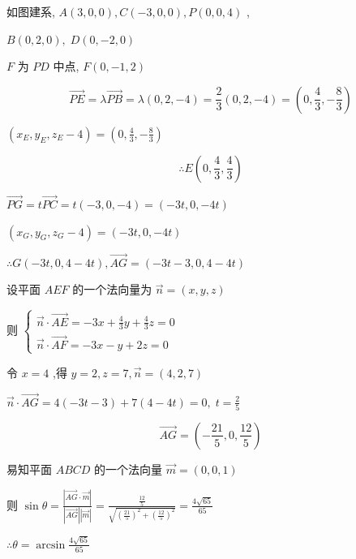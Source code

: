 \documentclass[10pt]{article}
\begin{document}
如图建系, \(A\left( {3,0,0}\right) ,C\left( {-3,0,0}\right) ,P\left( {0,0,4}\right)\) ,

\(B\left( {0,2,0}\right) ,\;D\left( {0, - 2,0}\right)\)

\(F\) 为 \({PD}\) 中点, \(F\left( {0, - 1,2}\right)\)

\[
\overrightarrow{PE} = \lambda \overrightarrow{PB} = \lambda \left( {0,2, - 4}\right)  = \frac{2}{3}\left( {0,2, - 4}\right)  = \left( {0,\frac{4}{3}, - \frac{8}{3}}\right)
\]

\(\left( {{x}_{E},{y}_{E},{z}_{E} - 4}\right)  = \left( {0,\frac{4}{3}, - \frac{8}{3}}\right)\)

\[
\therefore E\left( {0,\frac{4}{3},\frac{4}{3}}\right)
\]

\(\overrightarrow{PG} = t\overrightarrow{PC} = t\left( {-3,0, - 4}\right)  = \left( {-{3t},0, - {4t}}\right)\)

\(\left( {{x}_{G},{y}_{G},{z}_{G} - 4}\right)  = \left( {-{3t},0, - {4t}}\right)\)

\(\therefore G\left( {-{3t},0,4 - {4t}}\right) ,\overrightarrow{AG} = \left( {-{3t} - 3,0,4 - {4t}}\right)\)

设平面 \({AEF}\) 的一个法向量为 \(\overrightarrow{n} = \left( {x,y,z}\right)\)

则 \(\left\{  \begin{array}{l} \overrightarrow{n} \cdot  \overrightarrow{AE} =  - {3x} + \frac{4}{3}y + \frac{4}{3}z = 0 \\  \overrightarrow{n} \cdot  \overrightarrow{AF} =  - {3x} - y + {2z} = 0 \end{array}\right.\)

令 \(x = 4\) ,得 \(y = 2,z = 7,\overrightarrow{n} = \left( {4,2,7}\right)\)

\(\overrightarrow{n} \cdot  \overrightarrow{AG} = 4\left( {-{3t} - 3}\right)  + 7\left( {4 - {4t}}\right)  = 0,\;t = \frac{2}{5}\)

\[
\overrightarrow{AG} = \left( {-\frac{21}{5},0,\frac{12}{5}}\right)
\]

易知平面 \({ABCD}\) 的一个法向量 \(\overrightarrow{m} = \left( {0,0,1}\right)\)

则 \(\sin \theta  = \frac{\left| \overrightarrow{AG} \cdot  \overrightarrow{m}\right| }{\left| \overrightarrow{AG}\right| \left| \overrightarrow{m}\right| } = \frac{\frac{12}{5}}{\sqrt{{\left( \frac{21}{5}\right) }^{2} + {\left( \frac{12}{5}\right) }^{2}}} = \frac{4\sqrt{65}}{65}\)

\(\therefore \theta  = \arcsin \frac{4\sqrt{65}}{65}\)
\end{document}
